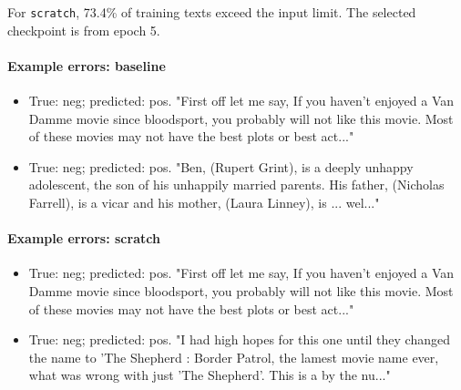 For \texttt{scratch}, 73.4\% of training texts exceed the input limit. The selected checkpoint is from epoch 5.

\par\medskip\noindent\begin{minipage}{\linewidth}

\paragraph{Example errors: baseline}

\begin{itemize}

\item True: neg; predicted: pos. "First off let me say, If you haven't enjoyed a Van Damme movie since bloodsport, you probably will not like this movie. Most of these movies may not have the best plots or best act..."

\item True: neg; predicted: pos. "Ben, (Rupert Grint), is a deeply unhappy adolescent, the son of his unhappily married parents. His father, (Nicholas Farrell), is a vicar and his mother, (Laura Linney), is ... wel..."

\end{itemize}

\end{minipage}\par

\par\medskip\noindent\begin{minipage}{\linewidth}

\paragraph{Example errors: scratch}

\begin{itemize}

\item True: neg; predicted: pos. "First off let me say, If you haven't enjoyed a Van Damme movie since bloodsport, you probably will not like this movie. Most of these movies may not have the best plots or best act..."

\item True: neg; predicted: pos. "I had high hopes for this one until they changed the name to 'The Shepherd : Border Patrol, the lamest movie name ever, what was wrong with just 'The Shepherd'. This is a by the nu..."

\end{itemize}

\end{minipage}\par

